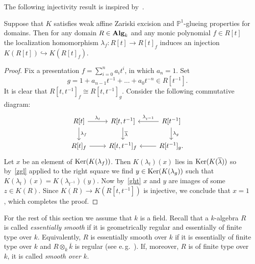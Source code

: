 \documentclass[oneside, 11pt]{amsart} \pdfoutput=1
\begin{document}
The following injectivity result is inspired by~\cite[Corollary~5.2]{Tu83}.
\begin{lemma} \label{lmp}
Suppose that $K$ satisfies weak affine Zariski excision and $\mathbb{P}^1$-glueing properties for domains. Then for any domain $R\in {\normalfont\textbf{Alg}}_k$ and any monic polynomial $f\in R[t]$ the localization homomorphism $\lambda_f\colon R[t]\rightarrow R[t]_f$ induces an injection $K(R[t])\hookrightarrow K(R[t]_f).$ \end{lemma}
\begin{proof}
	Fix a presentation $f=\sum_{i=0}^n a_it^i$, in which $a_n=1$. Set $$g=1+a_{n-1}t^{-1}+\ldots+a_0t^{-n}\in R[t^{-1}].$$ It is clear that $R[t, t^{-1}]_f \cong R[t, t^{-1}]_g$. Consider the following commutative diagram:
$$\begin{tikzcd}
	R[t] \ar{r}{\lambda_t} \ar{d}{\lambda_f} & R[t, t^{-1}] \ar{d}{\overline{\lambda}} & R[t^{-1}] \ar{l}[']{\lambda_{t^{-1}}} \ar{d}{\lambda_g}\\
	R[t]_f \ar{r} & R[t, t^{-1}]_f & R[t^{-1}]_g. \ar{l}
\end{tikzcd}$$
Let $x$ be an element of $\mathop{\mathrm{Ker}}\nolimits(K(\lambda_f))$. Then $K(\lambda_t)(x)$ lies in $\mathop{\mathrm{Ker}}\nolimits(K(\overline{\lambda}))$ so by~\cref{zgl} applied to the right square we find $y \in \mathop{\mathrm{Ker}}\nolimits(K(\lambda_{g}))$ such that $K(\lambda_t)(x) = K(\lambda_{t^{-1}})(y)$. Now by~\cref{ght} $x$ and $y$ are images of some $z \in K(R)$. Since $K(R) \to K(R[t, t^{-1}])$ is injective, we conclude that $x=1$, which completes the proof. \end{proof}

For the rest of this section we assume that $k$ is a field.
Recall that a $k$-algebra $R$ is called {\it essentially smooth} if it is geometrically regular and essentially of finite type over $k$. 
Equivalently, $R$ is essentially smooth over $k$ if it is essentially of finite type over $k$ and $R\otimes_k\overline k$ is regular (see e.\,g.~\cite[p.~137]{Sw98}). 
If, moreover, $R$ is of finite type over $k$, it is called {\it smooth over $k$}.
\end{document}

